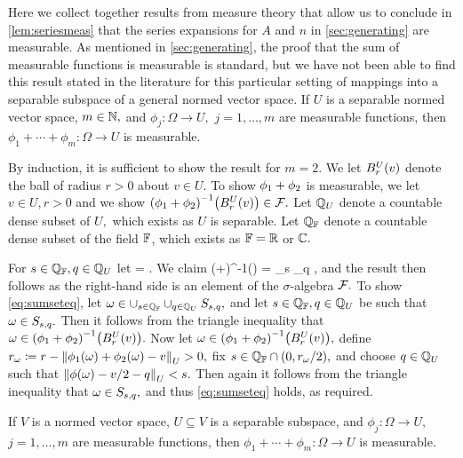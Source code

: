 Here we collect together results from measure theory that allow us to conclude in \cref{lem:seriesmeas} that the series expansions for $A$ and $n$ in \cref{sec:generating} are measurable. As mentioned in \cref{sec:generating}, the proof that the sum of measurable functions is measurable is standard, but we have not been able to find this result stated in the literature for this particular setting of mappings into a separable subspace of a general normed vector space.
\ble\label{lem:sepsum}
If $U$ is a separable normed vector space, $m \in \mathbb N,$ and $\phi_j:\Omega\rightarrow U,$ $j=1,\ldots,m$  are measurable functions, then $\phi_1+\cdots+\phi_m : \Omega\rightarrow U$ is measurable.
\ele

By induction, it is sufficient to show the result for $m=2.$ We let $\Ballspace{U}{r}{v}$ denote the ball of radius $r>0$ about $v \in U$. To show $\phi_{1}+\phi_{2}$ is measurable, we let $v \in U, r>0$ and we show $\mleft(\phio+\phit\mright)^{-1}\mleft(\Ballspace{U}{r}{v}\mright) \in \cF.$ Let $\mathbb Q_{U}$ denote a countable dense subset of $U,$ which exists as $U$ is separable. Let $\mathbb Q_{\mathbb F}$ denote a countable dense subset of the field $\mathbb F$, which exists as $\mathbb F = \mathbb R$ or $\mathbb C.$

For $s \in \mathbb Q_{\mathbb F}, q \in \mathbb Q_{U}$ let
\beqs
\setsq =  \cap {}.
\eeqs
We claim
\beq\label{eq:sumseteq}
\mleft(\phio+\phit\mright)^{-1}\mleft(\mright) = \bigcup_{s \in \QQFF} \bigcup_{q \in \QQU} \setsq,
\eeq
and the result then follows as the right-hand side is an element of the $\sigma$-algebra $\mathcal F.$ To show \eqref{eq:sumseteq}, let $\omega \in \cup_{s \in \mathbb Q_{\mathbb F}}\cup_{q \in \mathbb Q_{U}} S_{s,q},$ and let $s \in \mathbb Q_{\mathbb F}, q \in \mathbb Q_{U}$ be such that $\omega \in S_{s,q}.$ Then it follows from the triangle inequality that $\omega \in \mleft(\phio+\phit\mright)^{-1}\mleft(\Ballspace{U}{r}{v}\mright).$
Now let $\omega \in \mleft(\phio+\phit\mright)^{-1}\mleft(\Ballspace{U}{r}{v}\mright),$ define $\dw \de r - \NU{\phio(\omega)+\phit(\omega)-v} > 0,$ fix $s \in \mathbb Q_{\mathbb F} \cap (0,r_{\omega}/2),$ and choose $q \in \mathbb Q_{U}$ such that $\NU{\phi(\omega) - v/2 -q} < s.$ Then again it follows from the triangle inequality that $\omega \in S_{s,q},$ and thus \eqref{eq:sumseteq} holds, as required.
\epf

\bco\label{cor:sepsubsum}
If $V$ is a normed vector space, $U \subseteq V$ is a separable subspace, and $\phi_j:\Omega\rightarrow U,$  $j=1,\ldots,m$  are measurable functions, then $\phi_1+\cdots+\phi_m : \Omega\rightarrow U$ is measurable.
\eco

